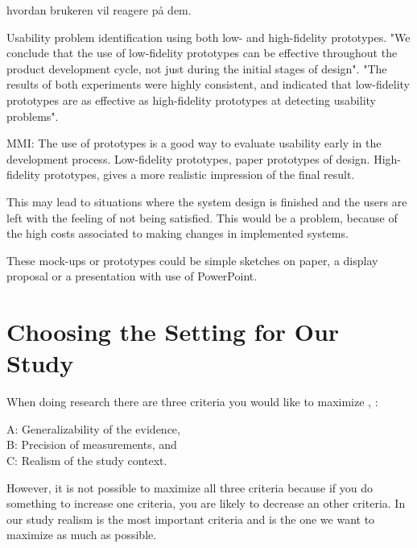 hvordan brukeren vil reagere på dem.     

Usability problem identification using both low- and high-fidelity prototypes. 
"We conclude that the use of low-fidelity prototypes can be effective throughout the product development cycle, not just during the initial stages of design". "The results of both experiments were highly consistent, and indicated that low-fidelity prototypes are as effective as high-fidelity prototypes at detecting usability problems".


MMI:
The use of prototypes is a good way to evaluate usability early in the development process.
Low-fidelity prototypes, paper prototypes of design.
High-fidelity prototypes, gives a more realistic impression of the final result. 

This may lead to situations where the system design is finished and the users are left with the feeling of not being satisfied. This would be a problem, because of the high costs associated to making changes in implemented systems.

These mock-ups or prototypes could be simple sketches on paper, a display proposal or a presentation with use of PowerPoint.

\section{Choosing the Setting for Our Study}
\label{sec:experimental}
When doing research there are three criteria you would like to maximize \cite{McGrath}, \cite{alsos}: 
 
A: Generalizability of the evidence, \\
B: Precision of measurements, and \\
C: Realism of the study context.  

However, it is not possible  to maximize all three criteria because if you do something to increase one criteria, you are likely to decrease an other criteria. In our study realism is the most important criteria and is the one we want to maximize as much as possible.

